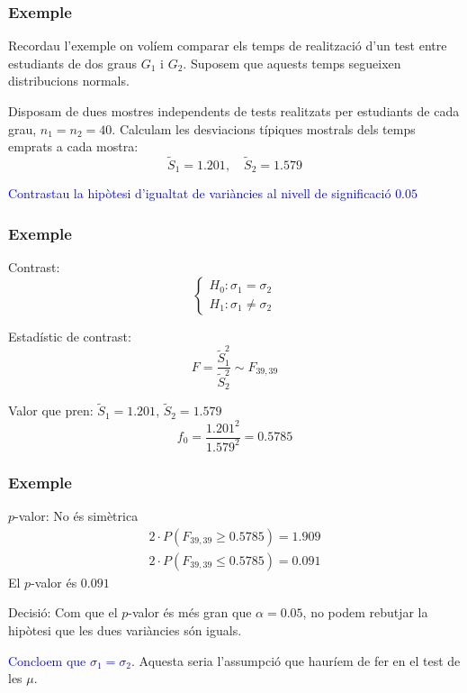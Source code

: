 \documentclass[12pt,t]{beamer}
\newcommand{\blue}[1]{\textcolor{blue}{#1}}
\renewcommand{\emph}[1]{{\color{red}#1}}
\renewcommand{\leq}{\leqslant}
\renewcommand{\geq}{\geqslant}
\theoremstyle{plain}
\theoremstyle{definition}
\begin{document}
\begin{frame}
\frametitle{Exemple}
Recordau l'exemple on volíem comparar els temps de realització d'un test 
entre estudiants de dos graus $G_1$ i $G_2$. \emph{Suposem que aquests temps segueixen distribucions normals}.
\medskip

Disposam de dues mostres independents de tests realitzats per estudiants de cada grau, $n_1=n_2=40$. Calculam les desviacions típiques
mostrals dels temps emprats a cada mostra:
$$
\widetilde{S}_1=1.201,\quad \widetilde{S}_2=1.579
$$


\blue{Contrastau la hipòtesi d'igualtat de variàncies al
nivell de significació $0.05$} 

\end{frame}


\begin{frame}
\frametitle{Exemple}


\emph{Contrast}:
$$
\left\{\begin{array}{l}
H_0:\sigma_1=\sigma_2\\
H_1:\sigma_1\neq \sigma_2
\end{array}\right.
$$

\emph{Estadístic de contrast}: 
$$
F=\frac{\widetilde{S}_1^2}{\widetilde{S}_2^2}\sim F_{39,39}
$$
\medskip

\emph{Valor que pren}: $\widetilde{S}_1=1.201$, $\widetilde{S}_2=1.579$
$$
f_0=\frac{1.201^2}{1.579^2}=0.5785
$$

\end{frame}

\begin{frame}
\frametitle{Exemple}

\emph{$p$-valor}: No és simètrica
$$
\begin{array}{l}
2\cdot P(F_{39,39}\geq 0.5785)= 1.909\\
2\cdot P(F_{39,39}\leq 0.5785)=0.091
\end{array}
$$
El $p$-valor és $0.091$
\medskip

\emph{Decisió}: Com que el $p$-valor és més gran que $\alpha=0.05$, no podem rebutjar la hipòtesi que les dues variàncies són iguals. \medskip

\blue{Concloem que $\sigma_1= \sigma_2$}. Aquesta seria l'assumpció que hauríem de fer en el test de les $\mu$.

\end{frame}
%
%
%
%
\end{document}

